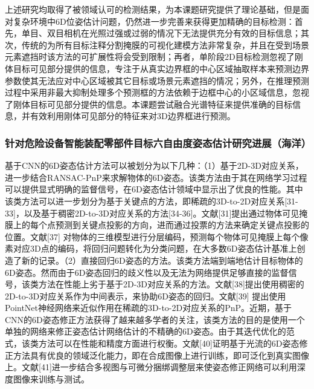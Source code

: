 \documentclass[12pt]{article}
\begin{document}
上述研究均取得了被领域认可的检测结果，为本课题研究提供了理论基础，但是面对复杂环境中6D位姿估计问题，仍然进一步完善来获得更加精确的目标检测：首先，单目、双目相机在光照过强或过弱的情况下无法提供充分有效的目标信息；其次，传统的为所有目标注释分割掩膜的可视化建模方法非常复杂，并且在受到场景元素遮挡时该方法的可扩展性将会受到限制；再者，单阶段2D目标检测忽视了刚体目标可见部分提供的信息，专注于从真实边界框的中心区域抽取样本来预测边界参数使其无法应对中心区域被其它目标或场景元素遮挡的情况；另外，在推理预测过程中采用非最大抑制处理多个预测框的方法依赖于边框中心的小区域信息，忽视了刚体目标可见部分提供的信息。本课题尝试融合光谱特征来提供准确的目标信息，并有效利用刚体可见部分的特征来对3D边界框进行预测。

\subsubsection{针对危险设备智能装配零部件目标六自由度姿态估计研究进展（海洋）}

基于CNN的6D姿态估计方法可以被划分为以下几种：（1）基于2D-3D对应关系，进一步结合RANSAC-PnP来求解物体的6D姿态。该类方法由于其在网络学习过程可以提供显式明确的监督信号，在6D姿态估计领域中显示出了优良的性能。其中该类方法可以进一步划分为基于关键点的方法，即稀疏的3D-to-2D对应关系[31-33]，以及基于稠密2D-to-3D对应关系的方法[34-36]。文献[31]提出通过物体可见掩膜上的每个点预测到关键点投影的方向，进而通过投票的方法来确定关键点投影的位置。文献[37] 对物体的三维模型进行分层编码，预测每个物体可见掩膜上每个像素对应3D点的编码，将回归问题转化为分类问题，在大多数6D姿态估计基准上创造了新的记录。（2）直接回归6D姿态的方法。该类方法端到端地估计目标物体的6D姿态。然而由于6D姿态回归的歧义性以及无法为网络提供足够直接的监督信号，该类方法在性能上劣于基于2D-3D对应关系的方法。文献[38]提出使用稠密的2D-to-3D对应关系作为中间表示，来协助6D姿态的回归。文献[39] 提出使用PointNet神经网络来近似作用在稀疏的3D-to-2D对应关系的PnP。近期，基于CNN的6D姿态修正方法获得了越来越多学者的关注，该类方法的目的是使用一个单独的网络来修正姿态估计网络估计的不精确的6D姿态。由于其迭代优化的范式，该类方法可以在性能和精度方面进行权衡。文献[40]证明基于光流的6D姿态修正方法具有优良的领域泛化能力，即在合成图像上进行训练，即可泛化到真实图像上。文献[41]进一步结合多视图与可微分捆绑调整层来使姿态修正网络可以利用深度图像来训练与测试。

{


}


\end{document}
